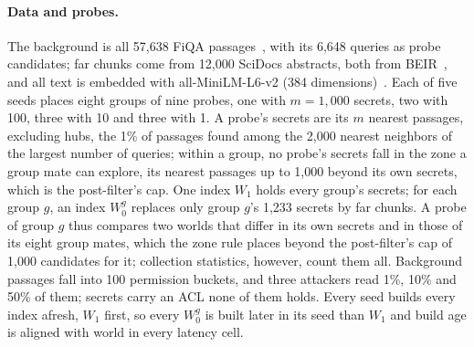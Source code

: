 \paragraph{Data and probes.}
The background is all 57,638 FiQA passages~\cite{maia2018www18}, with its 6,648 queries as probe
candidates; far chunks come from 12,000 SciDocs abstracts, both from BEIR~\cite{thakur2021beir}, and
all text is embedded with all-MiniLM-L6-v2 (384 dimensions)~\cite{reimers2019sentencebert,wang2020minilm}.
Each of five seeds places eight groups of nine probes, one with $m = 1{,}000$ secrets, two with 100,
three with 10 and three with 1. A probe's secrets are its $m$ nearest passages, excluding hubs, the 1\% of
passages found among the 2,000 nearest neighbors of the largest number of queries; within a group, no probe's secrets fall in the
zone a group mate can explore, its nearest passages up to 1,000 beyond its own secrets, which is the
post-filter's cap. One index $W_1$ holds every group's secrets; for each group $g$, an index $W_0^g$
replaces only group $g$'s 1,233 secrets by far chunks. A probe of group $g$ thus compares two worlds
that differ in its own secrets and in those of its eight group mates, which the zone rule places
beyond the post-filter's cap of 1,000 candidates for it; collection statistics, however, count them all.
Background passages fall into 100 permission buckets, and three
attackers read 1\%, 10\% and 50\% of them; secrets carry an ACL none of them holds. Every seed
builds every index afresh, $W_1$ first, so every $W_0^g$ is built later in its seed than $W_1$ and build age is aligned with world in every latency cell.

